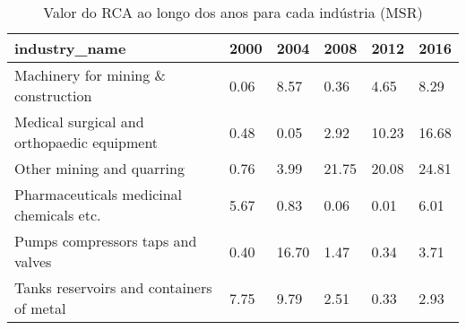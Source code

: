 \begin{table}
\centering
\caption{Valor do RCA ao longo dos anos para cada indústria (MSR)}
\begin{tabular}{p{6cm}p{1.5cm}p{1.5cm}p{1.5cm}p{1.5cm}p{1.5cm}}
\toprule
                             industry\_name & 2000 &  2004 &  2008 &  2012 &  2016 \\
\midrule
       Machinery for mining \& construction & 0.06 &  8.57 &  0.36 &  4.65 &  8.29 \\
Medical surgical and orthopaedic equipment & 0.48 &  0.05 &  2.92 & 10.23 & 16.68 \\
                 Other mining and quarring & 0.76 &  3.99 & 21.75 & 20.08 & 24.81 \\
  Pharmaceuticals medicinal chemicals etc. & 5.67 &  0.83 &  0.06 &  0.01 &  6.01 \\
         Pumps compressors taps and valves & 0.40 & 16.70 &  1.47 &  0.34 &  3.71 \\
  Tanks reservoirs and containers of metal & 7.75 &  9.79 &  2.51 &  0.33 &  2.93 \\
\bottomrule
\end{tabular}
\end{table}
